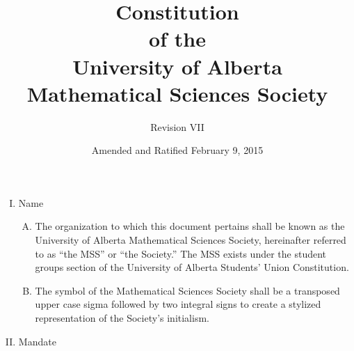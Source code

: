 \documentclass[11pt]{article}
\title{Constitution \\
of the\\
University of Alberta\\
Mathematical Sciences Society\\
}
\date{Amended and Ratified February 9, 2015}
\author{Revision VII}
\begin{document}
\maketitle

\begin{enumerate}[I.]
  \item Name
    \begin{enumerate}[A)]
      \item The organization to which this document pertains shall be known as
        the University of Alberta Mathematical Sciences Society, hereinafter
        referred to as ``the MSS'' or ``the Society.'' The MSS exists under the
        student groups section of the University of Alberta Students' Union
        Constitution.
      \item The symbol of the Mathematical Sciences Society shall be a
        transposed upper case sigma followed by two integral signs to create a
        stylized representation of the Society's initialism.
      \end{enumerate}
  \item Mandate
  

\end{enumerate}
\end{document}

